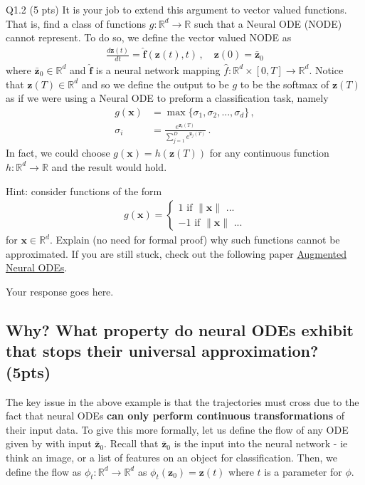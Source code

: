 \documentclass[12pt,letterpaper, onecolumn]{exam}
\theoremstyle{definition}
\begin{document}
\color{orange} Q1.2 (5 pts) \color{black} It is your job to extend this argument to vector valued functions. That is, find a class of functions $g: \mathbb{R}^d \to \mathbb{R}$ such that a Neural ODE (NODE) cannot represent. To do so, we define the vector valued NODE as 
\begin{align}
    \frac{d \bm{z}(t)}{dt} = \hat{\bm{f}}(\bm{z}(t), t)\,, \quad \bm{z}(0) = \bar{\bm{z}}_0    
\end{align}
where $\bar{\bm{z}}_0 \in \mathbb{R}^d$ and $\hat{\bm{f}}$ is a neural network mapping $\hat{f}: \mathbb{R}^d \times [0, T] \to \mathbb{R}^d$. Notice that $\bm{z}(T) \in \mathbb{R}^d$ and so we define the output to be $g$ to be the softmax of $\bm{z}(T)$ as if we were using a Neural ODE to preform a classification task, namely
\begin{align}
    g(\bm{x}) &= \max\{\sigma_1, \sigma_2, ..., \sigma_d\}\,, \\ 
    \sigma_i &= \frac{e^{\bm{z}_i(T)}}{\sum_{j=1}^D e^{\bm{z}_j(T)}}\,. 
\end{align}
In fact, we could choose $g(\bm{x}) = h(\bm{z}(T))$ for any continuous function $h:\mathbb{R}^d \to \mathbb{R}$ and the result would hold. 

Hint: consider functions of the form 
\begin{align}
    g(\bm{x}) = \begin{cases} 1 \text{ if }\|\bm{x}\| \text{ ...} \\ 
    -1 \text{ if }\|\bm{x}\|\text{ ...}
    \end{cases}
\end{align}
for $\bm{x} \in \mathbb{R}^d$. Explain (no need for formal proof) why such functions cannot be approximated. If you are still stuck, check out the following paper \href{https://arxiv.org/pdf/1904.01681}{Augmented Neural ODEs}.
\color{black}
\begin{tcolorbox}\centering
    Your response goes here. 
\end{tcolorbox}


\subsection{ Why? What property do neural ODEs exhibit that stops their universal approximation? (5pts)}

The key issue in the above example is that the trajectories must cross due to the fact that neural ODEs \textbf{can only perform continuous transformations} of their input data. 
To give this more formally, let us define the flow of any ODE given by  with input $\bar{\bm{z}}_0$. Recall that $\bar{\bm{z}}_0$ is the input into the neural network - ie think an image, or a list of features on an object for classification. Then, we define the flow as $\phi_t: \mathbb{R}^d \to \mathbb{R}^d$ as $\phi_t(\bm{z}_0) = \bm{z}(t)$ where $t$ is a parameter for $\phi$. 
\end{document}

